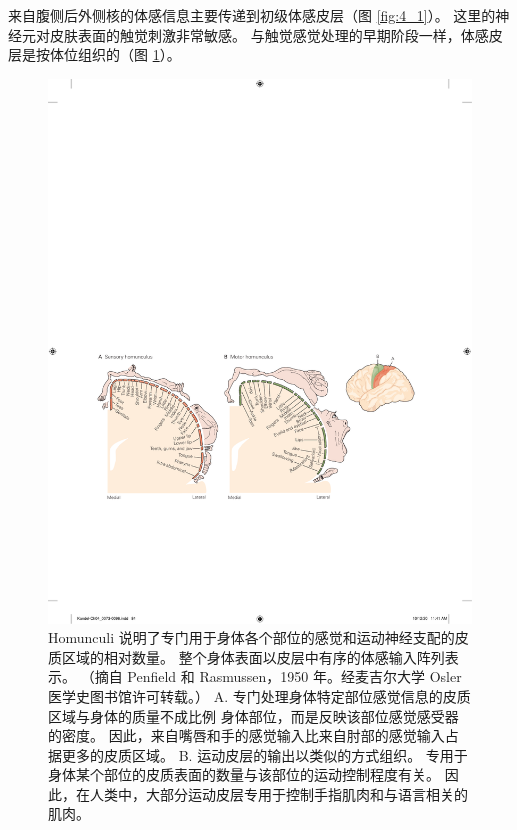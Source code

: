 来自腹侧后外侧核的体感信息主要传递到初级体感皮层（图 \ref{fig:4_1}）。 
这里的神经元对皮肤表面的触觉刺激非常敏感。 
与触觉感觉处理的早期阶段一样，体感皮层是按体位组织的（图 \ref{fig:4_8}）。

\begin{figure}[htbp]
	\centering
	\includegraphics[width=1.0\linewidth]{chap04/fig_4_8}
	\caption{Homunculi 说明了专门用于身体各个部位的感觉和运动神经支配的皮质区域的相对数量。 
		整个身体表面以皮层中有序的体感输入阵列表示。 
		（摘自 Penfield 和 Rasmussen，1950 年。经麦吉尔大学 Osler 医学史图书馆许可转载。） 
		A. 专门处理身体特定部位感觉信息的皮质区域与身体的质量不成比例 身体部位，而是反映该部位感觉感受器的密度。 
		因此，来自嘴唇和手的感觉输入比来自肘部的感觉输入占据更多的皮质区域。 
		B. 运动皮层的输出以类似的方式组织。 
		专用于身体某个部位的皮质表面的数量与该部位的运动控制程度有关。 
		因此，在人类中，大部分运动皮层专用于控制手指肌肉和与语言相关的肌肉。}
	\label{fig:4_8}
\end{figure}


